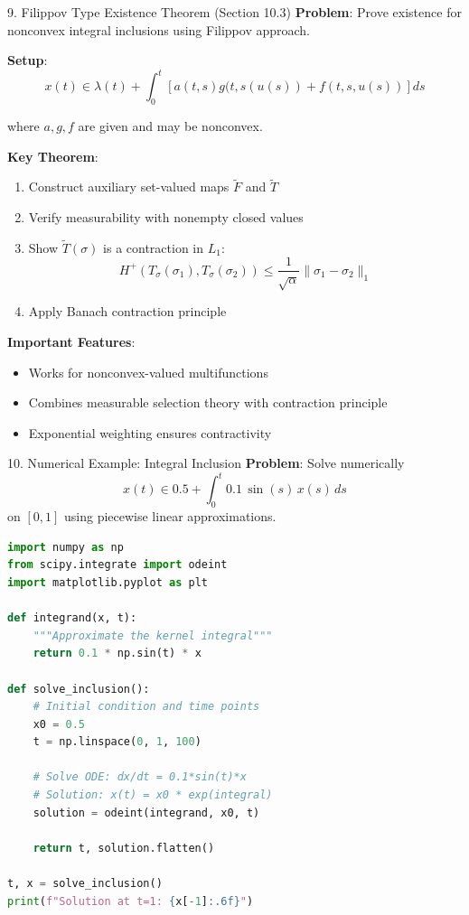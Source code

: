 \documentclass[aspectratio=169,10pt]{beamer}
\begin{document}
\begin{frame}[allowframebreaks]{9. Filippov Type Existence Theorem (Section 10.3)}
    \textbf{Problem}: Prove existence for nonconvex integral inclusions using Filippov approach.

    \vspace{0.3cm}
    \textbf{Setup}:
    $$x(t) \in \lambda(t) + \int_0^t [a(t,s)g(t, s(u(s)) + f(t,s,u(s))] ds$$

    where $a, g, f$ are given and may be nonconvex.

    \vspace{0.3cm}
    \textbf{Key Theorem}:
    \begin{enumerate}
        \item Construct auxiliary set-valued maps $\tilde{F}$ and $\tilde{T}$
        \item Verify measurability with nonempty closed values
        \item Show $\tilde{T}(\sigma)$ is a contraction in $L_1$:
        $$H^+(T_\sigma(\sigma_1), T_\sigma(\sigma_2)) \leq \frac{1}{\sqrt{\alpha}} \|\sigma_1 - \sigma_2\|_1$$
        \item Apply Banach contraction principle
    \end{enumerate}

    \vspace{0.3cm}
    \textbf{Important Features}:
    \begin{itemize}
        \item Works for nonconvex-valued multifunctions
        \item Combines measurable selection theory with contraction principle
        \item Exponential weighting ensures contractivity
    \end{itemize}
\end{frame}

\begin{frame}[fragile]{10. Numerical Example: Integral Inclusion}
    \textbf{Problem}: Solve numerically
    $$x(t) \in 0.5 + \int_0^t 0.1 \, \sin(s) \, x(s) \, ds$$
    on $[0, 1]$ using piecewise linear approximations.

    \begin{lstlisting}[language=Python, caption=Numerical Integration]
import numpy as np
from scipy.integrate import odeint
import matplotlib.pyplot as plt

def integrand(x, t):
    """Approximate the kernel integral"""
    return 0.1 * np.sin(t) * x

def solve_inclusion():
    # Initial condition and time points
    x0 = 0.5
    t = np.linspace(0, 1, 100)

    # Solve ODE: dx/dt = 0.1*sin(t)*x
    # Solution: x(t) = x0 * exp(integral)
    solution = odeint(integrand, x0, t)

    return t, solution.flatten()

t, x = solve_inclusion()
print(f"Solution at t=1: {x[-1]:.6f}")
    \end{lstlisting}
\end{frame}
\end{document}
